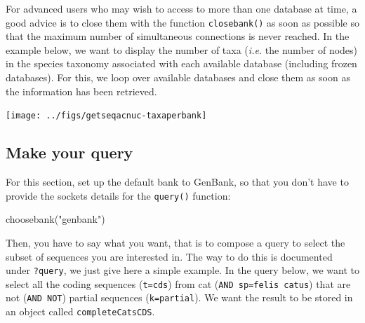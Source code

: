 \documentclass{article}
\begin{document}
For advanced users who may wish to access to more than one database at time, a good advice
is to close them with the function \texttt{closebank()} as soon as possible so that the maximum
number of simultaneous connections is never reached. In the example below, we want to
display the number of taxa (\textit{i.e.} the number of nodes) in the species taxonomy associated
with each available database (including frozen databases). For this, we loop over available databases and 
close them as soon as the information has been retrieved.

\begin{Schunk}
\end{Schunk}
\texttt{[image: ../figs/getseqacnuc-taxaperbank]}

\subsection{Make your query}

For this section, set up the default bank to GenBank, so that you don't have 
to provide the sockets details for the \texttt{query()} function:

\begin{Schunk}
\begin{Sinput}
 choosebank("genbank")
\end{Sinput}
\end{Schunk}

Then, you have to say what you want, that is to compose a query
to select the subset of sequences you are interested in. The way to do this is
documented under \texttt{?query}, we just give here a simple example. 
In the query below, we want to select all the coding sequences 
(\texttt{t=cds}) from cat (\texttt{AND sp=felis catus}) that are not 
(\texttt{AND NOT}) partial sequences (\texttt{k=partial}). 
We want the result to be stored in an object called \texttt{completeCatsCDS}.
\end{document}
